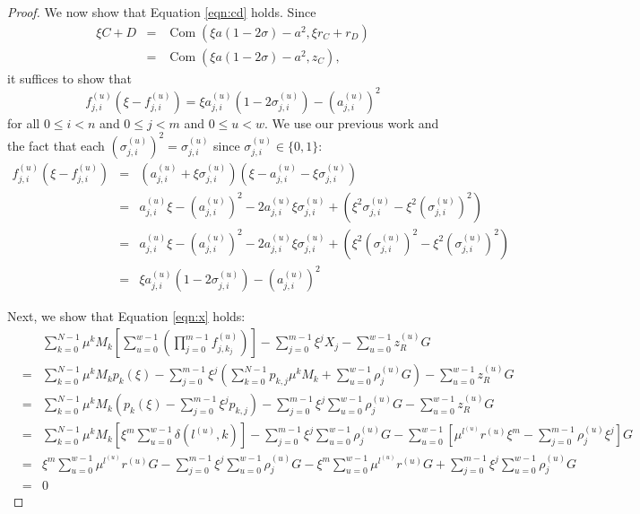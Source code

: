 \documentclass{article}
\newcommand{\com}{\operatorname{Com}}
\newcommand{\sumj}{\sum_{j=0}^{m-1}}
\newcommand{\sumk}{\sum_{k=0}^{N-1}}
\newcommand{\sumu}{\sum_{u=0}^{w-1}}
\theoremstyle{definition}
\begin{document}
\begin{proof}
We now show that Equation \ref{eqn:cd} holds.
Since
\begin{eqnarray*}
\xi C + D &=& \com(\xi a(1 - 2\sigma) - a^2,\xi r_C + r_D) \\
&=& \com(\xi a(1 - 2\sigma) - a^2,z_C),
\end{eqnarray*}
it suffices to show that $$f_{j,i}^{(u)}\left( \xi - f_{j,i}^{(u)} \right) = \xi a_{j,i}^{(u)}\left( 1 - 2\sigma_{j,i}^{(u)} \right) - \left(a_{j,i}^{(u)}\right)^2$$ for all $0 \leq i < n$ and $0 \leq j < m$ and $0 \leq u < w$.
We use our previous work and the fact that each $\left(\sigma_{j,i}^{(u)}\right)^2 = \sigma_{j,i}^{(u)}$ since $\sigma_{j,i}^{(u)} \in \{0,1\}$:
\begin{eqnarray*}
f_{j,i}^{(u)}\left( \xi - f_{j,i}^{(u)} \right) &=& \left( a_{j,i}^{(u)} + \xi\sigma_{j,i}^{(u)} \right)\left( \xi - a_{j,i}^{(u)} - \xi\sigma_{j,i}^{(u)} \right) \\
&=& a_{j,i}^{(u)}\xi - \left(a_{j,i}^{(u)}\right)^2 - 2a_{j,i}^{(u)}\xi\sigma_{j,i}^{(u)} + \left( \xi^2\sigma_{j,i}^{(u)} - \xi^2\left(\sigma_{j,i}^{(u)}\right)^2 \right) \\
&=& a_{j,i}^{(u)}\xi - \left(a_{j,i}^{(u)}\right)^2 - 2a_{j,i}^{(u)}\xi\sigma_{j,i}^{(u)} + \left( \xi^2\left(\sigma_{j,i}^{(u)}\right)^2 - \xi^2\left(\sigma_{j,i}^{(u)}\right)^2 \right) \\
&=& \xi a_{j,i}^{(u)}\left( 1 - 2\sigma_{j,i}^{(u)} \right) - \left(a_{j,i}^{(u)}\right)^2
\end{eqnarray*}

Next, we show that Equation \ref{eqn:x} holds:
\begin{eqnarray*}
&& \sumk \mu^kM_k \left[ \sumu \left( \prod_{j=0}^{m-1} f^{(u)}_{j,k_j} \right) \right] - \sumj \xi^jX_j - \sumu z^{(u)}_RG \\
&=& \sumk \mu^kM_k p_k(\xi) - \sumj \xi^j \left( \sumk p_{k,j}\mu^kM_k + \sumu \rho^{(u)}_jG \right) - \sumu z^{(u)}_RG \\
&=& \sumk \mu^kM_k \left( p_k(\xi) - \sumj \xi^j p_{k,j} \right) - \sumj \xi^j \sumu \rho^{(u)}_jG - \sumu z^{(u)}_RG \\
&=& \sumk \mu^kM_k \left[ \xi^m \sumu \delta\left( l^{(u)},k \right) \right] - \sumj \xi^j \sumu \rho^{(u)}_jG - \sumu\left[ \mu^{l^{(u)}}r^{(u)}\xi^m - \sumj \rho^{(u)}_j\xi^j \right]G \\
&=& \xi^m\sumu \mu^{l^{(u)}}r^{(u)}G - \sumj \xi^j \sumu \rho^{(u)}_jG - \xi^m\sumu \mu^{l^{(u)}}r^{(u)}G + \sumj \xi^j \sumu \rho^{(u)}_jG \\
&=& 0
\end{eqnarray*}


\end{proof}
\end{document}
